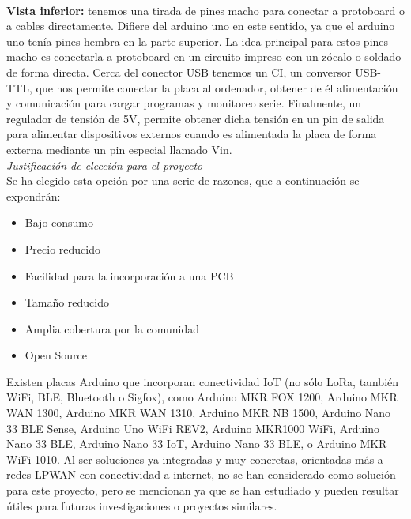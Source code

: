 \documentclass[12pt]{article}
\begin{document}
	 \\
	
	\noindent \textbf{Vista inferior:} tenemos una tirada de pines macho para conectar a protoboard o a cables directamente. Difiere del arduino uno en este sentido, ya que el arduino uno tenía pines hembra en la parte superior. La idea principal para estos pines macho es conectarla a protoboard en un circuito impreso con un zócalo o soldado de forma directa.
	Cerca del conector USB tenemos un CI, un conversor USB-TTL, que nos permite conectar la placa al ordenador, obtener de él alimentación y comunicación para cargar programas y monitoreo serie. Finalmente, un regulador de tensión de 5V, permite obtener dicha tensión en un pin de salida para alimentar dispositivos externos cuando es alimentada la placa de forma externa mediante un pin especial llamado Vin.  \\

	\noindent \textit{Justificación de elección para el proyecto} \\
	
	\noindent Se ha elegido esta opción por una serie de razones, que a continuación se expondrán: \\
	
	\begin{itemize}
		\item Bajo consumo
		\item Precio reducido
		\item Facilidad para la incorporación a una PCB
		\item Tamaño reducido
		\item Amplia cobertura por la comunidad
		\item Open Source
	\end{itemize}
	

	\noindent Existen placas Arduino que incorporan conectividad IoT (no sólo LoRa, también WiFi, BLE, Bluetooth o Sigfox), como Arduino MKR FOX 1200, Arduino MKR WAN 1300, Arduino MKR WAN 1310, Arduino MKR NB 1500, Arduino Nano 33 BLE Sense, Arduino Uno WiFi REV2, Arduino MKR1000 WiFi, Arduino Nano 33 BLE, Arduino Nano 33 IoT, Arduino Nano 33 BLE, o Arduino MKR WiFi 1010.  Al ser soluciones ya integradas y muy concretas, orientadas más a redes LPWAN con conectividad a internet, no se han considerado como solución para este proyecto, pero se mencionan ya que se han estudiado y pueden resultar útiles para futuras investigaciones o proyectos similares.\\
	
\end{document}
